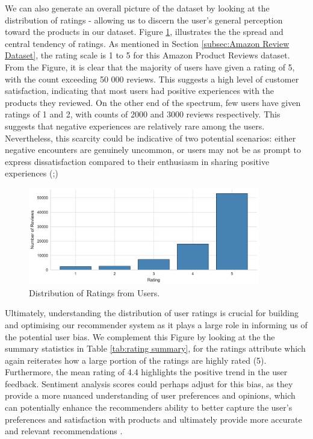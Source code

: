 We can also generate an overall picture of the dataset by looking at the distribution of ratings - allowing us to discern the user's general perception toward the products in our dataset. Figure \ref{fig:ratings distribution}, illustrates the the spread and central tendency of ratings. As mentioned in Section \ref{subsec:Amazon Review Dataset}, the rating scale is 1 to 5 for this Amazon Product Reviews dataset. From the Figure, it is clear that the majority of users have given a rating of 5, with the count exceeding 50 000 reviews. This suggests a high level of customer satisfaction, indicating that most users had positive experiences with the products they reviewed. On the other end of the spectrum, few users have given ratings of 1 and 2, with counts of 2000 and 3000 reviews respectively. This suggests that negative experiences are relatively rare among the users. Nevertheless, this scarcity could be indicative of two potential scenarios: either negative encounters are genuinely uncommon, or users may not be as prompt to express dissatisfaction compared to their enthusiasm in sharing positive experiences (\cite{chen2015augmenting};\cite{skalicky2015statistical})

\begin{figure}[h]
  \centering
  \includegraphics[width=0.9\textwidth]{Figures/rating_distribution.pdf} %
  \caption{Distribution of Ratings from Users.}
  \label{fig:ratings distribution}
\end{figure}

Ultimately, understanding the distribution of user ratings is crucial for building and optimising our recommender system as it plays a large role in informing us of the potential user bias. We complement this Figure by looking at the the summary statistics in Table \ref{tab:rating summary}, for the ratings attribute which again reiterates how a large portion of the ratings are highly rated (5). Furthermore, the mean rating of 4.4 highlights the positive trend in the user feedback. Sentiment analysis scores could perhaps adjust for this bias, as they provide a more nuanced understanding of user preferences and opinions, which can potentially enhance the recommenders  ability to better capture the user's preferences and satisfaction with products and ultimately provide more accurate and relevant recommendations \cite{dang2021approach}.

